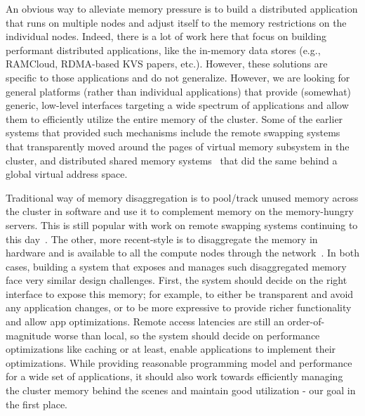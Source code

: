 An obvious way to alleviate memory pressure is to build a 
distributed application that runs on multiple nodes and 
adjust itself to the memory restrictions on the individual 
nodes. Indeed, there is a lot of work here that focus on building 
performant distributed applications, like the in-memory 
data stores (e.g., RAMCloud, RDMA-based KVS papers, etc.). 
However, these solutions are specific to those applications and 
do not generalize. However, we are looking for general 
platforms (rather than individual applications) that provide 
(somewhat) generic, low-level interfaces targeting a wide 
spectrum of applications and allow them to efficiently utilize 
the entire memory of the cluster. Some of the earlier 
systems that provided such mechanisms include the remote 
swapping systems~\cite{gms,cashmere} that transparently moved 
around the pages of virtual memory subsystem in the cluster,
and distributed shared memory systems~\cite{treadmarks,dsm1}
that did the same behind a global virtual address space.

Traditional way of memory disaggregation is to pool/track  
unused memory across the cluster in software 
and use it to complement memory on the memory-hungry servers.
This is still popular with work on remote swapping systems 
continuing to this day~\cite{infiniswap,fastswap,zswap,leap}.
The other, more recent-style is to disaggregate the memory 
in hardware and is available to all the compute nodes through
the network~\cite{legoos}. In both cases, building a system 
that exposes and manages such disaggregated memory face very 
similar design challenges. First, the system should decide on
the right interface to expose this memory; for example,
to either be transparent and avoid any application changes, 
or to be more expressive to provide richer functionality and 
allow app optimizations. Remote access latencies are still an 
order-of-magnitude worse than local, so the system should 
decide on performance optimizations like caching or at least,
enable applications to implement their optimizations. 
While providing reasonable programming model and performance
for a wide set of applications, it should also work towards 
efficiently managing the cluster memory behind the scenes and 
maintain good utilization - our goal in the first place.

